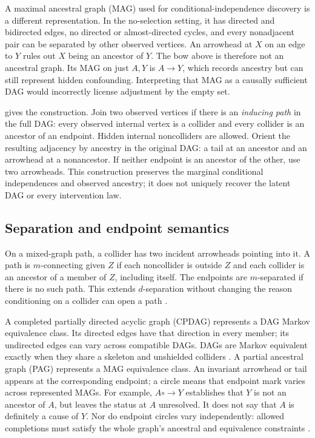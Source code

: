 A maximal ancestral graph (MAG) used for conditional-independence discovery
is a different representation. In the no-selection setting, it has directed
and bidirected edges, no directed or almost-directed cycles, and every
nonadjacent pair can be separated by other observed vertices. An arrowhead
at $X$ on an edge to $Y$ rules out $X$ being an ancestor of $Y$. The bow
above is therefore not an ancestral graph. Its MAG on just $A,Y$ is
$A\to Y$, which records ancestry but can still represent hidden confounding.
Interpreting that MAG as a causally sufficient DAG would incorrectly
license adjustment by the empty set.

\citet[Section 3, Definitions 1--3]{zhang2008} gives the construction.
Join two observed vertices if there is an \emph{inducing path} in the full
DAG: every observed internal vertex is a collider and every collider is
an ancestor of an endpoint. Hidden internal noncolliders are allowed.
Orient the resulting adjacency by ancestry in the original DAG: a tail
at an ancestor and an arrowhead at a nonancestor. If neither endpoint
is an ancestor of the other, use two arrowheads. This construction
preserves the marginal conditional independences and observed ancestry;
it does not uniquely recover the latent DAG or every intervention law.

\subsection{Separation and endpoint semantics}
On a mixed-graph path, a collider has two incident arrowheads pointing
into it. A path is $m$-connecting given $Z$ if each noncollider is outside
$Z$ and each collider is an ancestor of a member of $Z$, including itself.
The endpoints are $m$-separated if there is no such path. This extends
$d$-separation without changing the reason conditioning on a collider
can open a path \citep[Definition 2]{zhang2008}.

A completed partially directed acyclic graph (CPDAG) represents a DAG
Markov equivalence class. Its directed edges have that direction in every
member; its undirected edges can vary across compatible DAGs. DAGs are
Markov equivalent exactly when they share a skeleton and unshielded
colliders \citep[Definition 6.24, Lemma 6.25]{peters2017}.
A partial ancestral graph (PAG) represents a MAG equivalence class.
An invariant arrowhead or tail appears at the corresponding endpoint;
a circle means that endpoint mark varies across represented MAGs.
For example, $A\mathbin{\circ\!\!\to}Y$ establishes that $Y$ is not
an ancestor of $A$, but leaves the status at $A$ unresolved. It does
not say that $A$ is definitely a cause of $Y$. Nor do endpoint circles
vary independently: allowed completions must satisfy the whole graph's
ancestral and equivalence constraints \citep[Definition 3]{zhang2008}.

